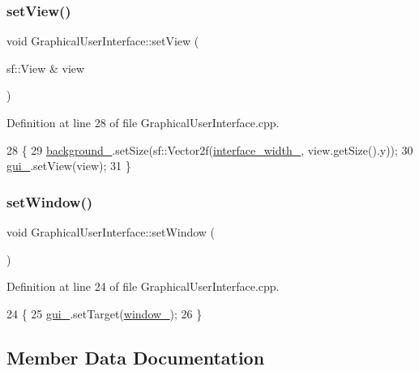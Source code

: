 \subsubsection{\texorpdfstring{set\+View()}{setView()}}
{\footnotesize\ttfamily void Graphical\+User\+Interface\+::set\+View (\begin{DoxyParamCaption}\item[{sf\+::\+View \&}]{view }\end{DoxyParamCaption})}



Definition at line 28 of file Graphical\+User\+Interface.\+cpp.


\begin{DoxyCode}
28                                                  \{
29     \hyperlink{classGraphicalUserInterface_a6d706ef82ec59d143a009331b40681bb}{background\_}.setSize(sf::Vector2f(\hyperlink{classGraphicalUserInterface_ae3c07ea59e557909f92882028fafb0a3}{interface\_width\_}, view.getSize().y));
30     \hyperlink{classGraphicalUserInterface_ab07abda0fdb8e2965b70d2024fa3cf20}{gui\_}.setView(view);
31 \}
\end{DoxyCode}
\mbox{\label{classGraphicalUserInterface_a9dc5f335b77be5a4d871926155afb8dd}} 
\subsubsection{\texorpdfstring{set\+Window()}{setWindow()}}
{\footnotesize\ttfamily void Graphical\+User\+Interface\+::set\+Window (\begin{DoxyParamCaption}{ }\end{DoxyParamCaption})}



Definition at line 24 of file Graphical\+User\+Interface.\+cpp.


\begin{DoxyCode}
24                                        \{
25     \hyperlink{classGraphicalUserInterface_ab07abda0fdb8e2965b70d2024fa3cf20}{gui\_}.setTarget(\hyperlink{classGraphicalUserInterface_ae51adeb759a97196eda3b37bfc80a452}{window\_});
26 \}
\end{DoxyCode}


\subsection{Member Data Documentation}
\mbox{\label{classGraphicalUserInterface_a6d706ef82ec59d143a009331b40681bb}} 
